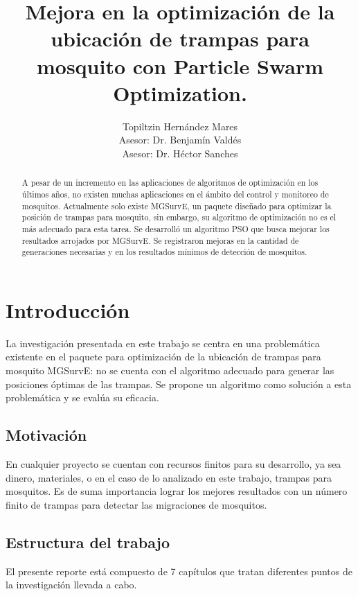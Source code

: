 \documentclass[letterpaper]{report}
\title{\bf
  Mejora en la optimización de la ubicación de trampas para mosquito con
  Particle Swarm Optimization.
}
\author{
  Topiltzin Hernández Mares \\
  [1cm]{\small Asesor: Dr. Benjamín Valdés}\\
  \small Asesor: Dr. Héctor Sanches
}
\begin{document}
\maketitle
\thispagestyle{empty}
\pagestyle{empty}
\tableofcontents
\listoffigures
\listoftables

\begin{abstract}
  A pesar de un incremento en las aplicaciones de algoritmos de optimización en
  los últimos años, no existen muchas aplicaciones en el ámbito del control y
  monitoreo de mosquitos. Actualmente solo existe MGSurvE, un paquete diseñado
  para optimizar la posición de trampas para mosquito, sin embargo, su algoritmo
  de optimización no es el más adecuado para esta tarea. Se desarrolló un
  algoritmo PSO que busca mejorar los resultados arrojados por MGSurvE. Se
  registraron mejoras en la cantidad de generaciones necesarias y en los
  resultados mínimos de detección de mosquitos. 
\end{abstract}

\chapter{Introducción}

  La investigación presentada en este trabajo se centra en una problemática
  existente en el paquete para optimización de la ubicación de trampas para
  mosquito MGSurvE: no se cuenta con el algoritmo adecuado para generar las
  posiciones óptimas de las trampas. Se propone un algoritmo como solución a
  esta problemática y se evalúa su eficacia. 

  \section{Motivación}

  En cualquier proyecto se cuentan con recursos finitos para su desarrollo, ya
  sea dinero, materiales, o en el caso de lo analizado en este trabajo, trampas
  para mosquitos. Es de suma importancia lograr los mejores resultados con un
  número finito de trampas para detectar las migraciones de mosquitos.

  \section{Estructura del trabajo}

  El presente reporte está compuesto de 7 capítulos que tratan diferentes puntos
  de la investigación llevada a cabo.
\end{document}
